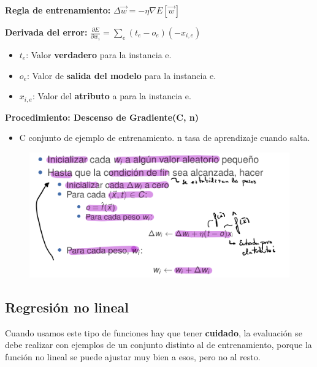 \documentclass[12pt, twoside, openright]{report} %
\begin{document}
\textbf{Regla de entrenamiento:}
\(\Delta \vec{w}=-\eta \nabla E[\vec{w}]\)

\textbf{Derivada del error:}
\(\frac{\partial E}{\partial w_{i}}=\sum_{e}\left(t_{e}-o_{e}\right)\left(-x_{i, e}\right)\)

\begin{itemize}

\item
  \(t_e\): Valor \textbf{verdadero} para la instancia e.
\item
  \(o_e\): Valor de \textbf{salida del modelo} para la instancia e.
\item
  \(x_{i,e}\): Valor del \textbf{atributo} a para la instancia e.
\end{itemize}
\pagebreak
\textbf{Procedimiento: Descenso de Gradiente(C, n)}

\begin{itemize}

\item
  C conjunto de ejemplo de entrenamiento. n tasa de aprendizaje cuando
  salta.
\end{itemize}

\begin{figure}[H]
	{\includegraphics[scale=.2]{image-20210305224415026.png}}
\end{figure}

\subsection{Regresión no lineal}

Cuando usamos este tipo de funciones hay que tener \textbf{cuidado}, la
evaluación se debe realizar con ejemplos de un conjunto distinto al de
entrenamiento, porque la función no lineal se puede ajustar muy bien a
esos, pero no al resto.
\end{document}
